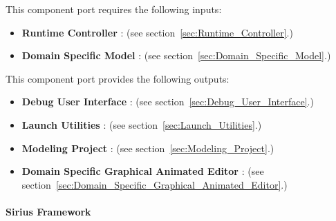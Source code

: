 \documentclass{gemoc} %
\begin{document}
This component port requires the following inputs:
\begin{itemize}
  \item \textbf{Runtime Controller} :
(see section~\ref{sec:Runtime_Controller}.)
  \item \textbf{Domain Specific Model} :
(see section~\ref{sec:Domain_Specific_Model}.)
\end{itemize}

This component port provides the following outputs:
\begin{itemize}
  \item \textbf{Debug User Interface} :
(see section~\ref{sec:Debug_User_Interface}.)
  \item \textbf{Launch Utilities} :
(see section~\ref{sec:Launch_Utilities}.)
  \item \textbf{Modeling Project} :
(see section~\ref{sec:Modeling_Project}.)
  \item \textbf{Domain Specific Graphical Animated Editor} :
(see section~\ref{sec:Domain_Specific_Graphical_Animated_Editor}.)
\end{itemize}

\paragraph{Sirius Framework}
\label{sec:Sirius_Framework}
\end{document}
